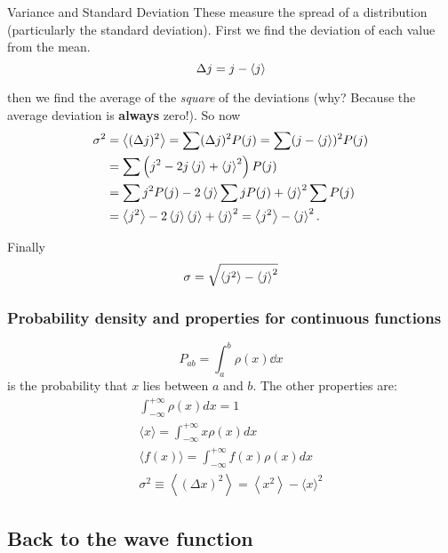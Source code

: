 \begin{frame}{Variance and Standard Deviation}
	These measure the spread of a distribution (particularly the standard deviation).
	First we find the deviation of each value from the mean.
	\[
		\Delta j = j - \ev j
	\]

	then we find the average of the \textit{square} of the deviations (why? Because the average deviation is \textbf{always} zero!). So now
	\begin{align*}
		\sigma^2 & =\ev{(\Delta j)^2} = \sum(\Delta j)^2 P(j)=\sum(j-\ev{j})^2 P(j) \\
		         & =\sum\left(j^2-2 j \ev{j} + \ev{j}^2\right) P(j)                 \\
		         & =\sum j^2 P(j)-2 \ev{j} \sum j P(j)+\ev{j}^2 \sum P(j)           \\
		         & =\ev{ j^2}-2\ev{ j}\ev{ j}+\ev{ j}^2=\ev{ j^2}-\ev{ j}^2 .
	\end{align*}

	Finally $$\sigma = \sqrt{\ev{ j^2}-\ev{ j}^2}$$
\end{frame}


\begin{frame}
	\frametitle{Probability density and properties for continuous functions}
	$$ P_{ab} = \int_a^b \rho(x) \dd{x}$$
	is the probability that $x$ lies between $a$ and $b$. The other properties are:
	\begin{gather}
		\int_{-\infty}^{+\infty} \rho(x) d x=1 \\
		\langle x\rangle=\int_{-\infty}^{+\infty} x \rho(x) d x \\
		\langle f(x)\rangle=\int_{-\infty}^{+\infty} f(x) \rho(x) d x \\
		\sigma^2 \equiv\left\langle(\Delta x)^2\right\rangle=\left\langle x^2\right\rangle-\langle x\rangle^2
	\end{gather}

\end{frame}

\subsection{Back to the wave function}



